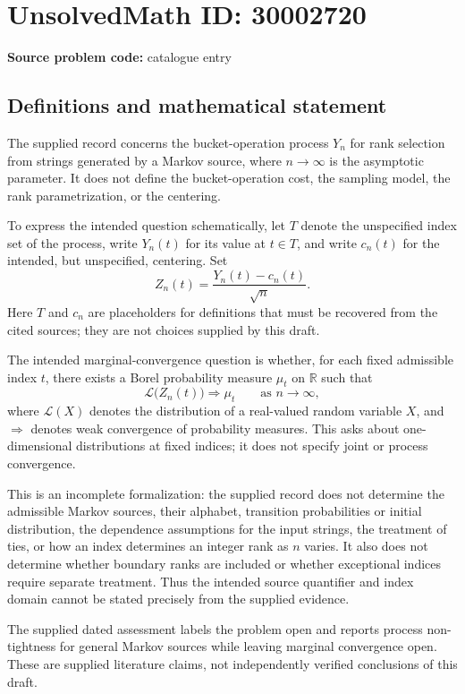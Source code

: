 \documentclass[11pt]{article}
\newcommand{\R}{\mathbb{R}}
\begin{document}
\section*{UnsolvedMath ID: 30002720}
\textbf{Source problem code:} catalogue entry
\subsection{Definitions and mathematical statement}
The supplied record concerns the bucket-operation process \(Y_n\) for rank selection from strings generated by a Markov source, where \(n\to\infty\) is the asymptotic parameter. It does not define the bucket-operation cost, the sampling model, the rank parametrization, or the centering.

To express the intended question schematically, let \(T\) denote the unspecified index set of the process, write \(Y_n(t)\) for its value at \(t\in T\), and write \(c_n(t)\) for the intended, but unspecified, centering. Set
\[
Z_n(t)=\frac{Y_n(t)-c_n(t)}{\sqrt n}.
\]
Here \(T\) and \(c_n\) are placeholders for definitions that must be recovered from the cited sources; they are not choices supplied by this draft.

The intended marginal-convergence question is whether, for each fixed admissible index \(t\), there exists a Borel probability measure \(\mu_t\) on \(\R\) such that
\[
\mathcal L\bigl(Z_n(t)\bigr)\Longrightarrow\mu_t
\qquad\text{as }n\to\infty,
\]
where \(\mathcal L(X)\) denotes the distribution of a real-valued random variable \(X\), and \(\Longrightarrow\) denotes weak convergence of probability measures. This asks about one-dimensional distributions at fixed indices; it does not specify joint or process convergence.

This is an incomplete formalization: the supplied record does not determine the admissible Markov sources, their alphabet, transition probabilities or initial distribution, the dependence assumptions for the input strings, the treatment of ties, or how an index determines an integer rank as \(n\) varies. It also does not determine whether boundary ranks are included or whether exceptional indices require separate treatment. Thus the intended source quantifier and index domain cannot be stated precisely from the supplied evidence.

The supplied dated assessment labels the problem open and reports process non-tightness for general Markov sources while leaving marginal convergence open. These are supplied literature claims, not independently verified conclusions of this draft.
\end{document}
